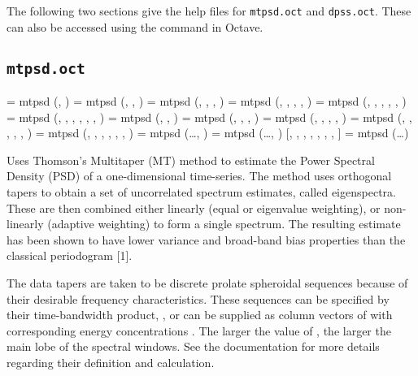 The following two sections give the help files for \texttt{mtpsd.oct} and \texttt{dpss.oct}.  These can also be accessed using the  command in Octave.

\subsection{\texttt{mtpsd.oct}}

 { =} {mtpsd (, ) }
 { =} {mtpsd (, , ) }
 { =} {mtpsd (, , , ) }
 { =} {mtpsd (, , , , ) }
 { =} {mtpsd (, , , , , ) }
 { =} {mtpsd (, , , , , , ) }
 { =} {mtpsd (, , ) }
 { =} {mtpsd (, , , ) }
 { =} {mtpsd (, , , , ) }
 { =} {mtpsd (, , , , , ) }
 { =} {mtpsd (, , , , , , ) }
 { =} {mtpsd (\dots{}, ) }
 { =} {mtpsd (\dots{}, ) }
 {[, , , , , , , ] =} {mtpsd (\dots{}) }
\vspace{-0.5em}

\noindent Uses Thomson's Multitaper (MT) method to estimate the Power Spectral Density (PSD) of a one-dimensional time-series. The method uses orthogonal tapers to obtain a set of uncorrelated spectrum estimates, called eigenspectra.  These are then combined either linearly (equal or eigenvalue weighting), or non-linearly (adaptive weighting) to form a single spectrum. The resulting estimate has been shown to have lower variance and broad-band bias properties than the classical periodogram [1]. 

The data tapers are taken to be discrete prolate spheroidal sequences because of their desirable frequency characteristics. These sequences can be specified by their time-bandwidth product, , or can be supplied as column vectors of  with corresponding energy concentrations .  The larger the value of , the larger the main lobe of the spectral windows.  See the  documentation for more details regarding their definition and calculation.

